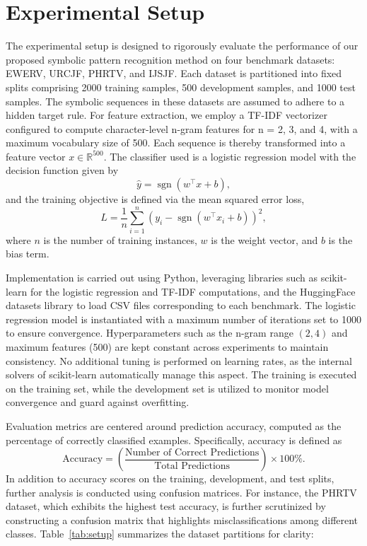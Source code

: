 \documentclass{article}
\begin{document}
\section{Experimental Setup}
The experimental setup is designed to rigorously evaluate the performance of our proposed symbolic pattern recognition method on four benchmark datasets: EWERV, URCJF, PHRTV, and IJSJF. Each dataset is partitioned into fixed splits comprising 2000 training samples, 500 development samples, and 1000 test samples. The symbolic sequences in these datasets are assumed to adhere to a hidden target rule. For feature extraction, we employ a TF-IDF vectorizer configured to compute character-level n-gram features for n = 2, 3, and 4, with a maximum vocabulary size of 500. Each sequence is thereby transformed into a feature vector \( x \in \mathbb{R}^{500} \). The classifier used is a logistic regression model with the decision function given by
\[
\hat{y} = \operatorname{sgn}(w^\top x + b),
\]
and the training objective is defined via the mean squared error loss,
\[
L = \frac{1}{n}\sum_{i=1}^{n}\left(y_i - \operatorname{sgn}(w^\top x_i + b)\right)^2,
\]
where \( n \) is the number of training instances, \( w \) is the weight vector, and \( b \) is the bias term.

Implementation is carried out using Python, leveraging libraries such as scikit-learn for the logistic regression and TF-IDF computations, and the HuggingFace datasets library to load CSV files corresponding to each benchmark. The logistic regression model is instantiated with a maximum number of iterations set to 1000 to ensure convergence. Hyperparameters such as the n-gram range \((2, 4)\) and maximum features (500) are kept constant across experiments to maintain consistency. No additional tuning is performed on learning rates, as the internal solvers of scikit-learn automatically manage this aspect. The training is executed on the training set, while the development set is utilized to monitor model convergence and guard against overfitting.

Evaluation metrics are centered around prediction accuracy, computed as the percentage of correctly classified examples. Specifically, accuracy is defined as
\[
\text{Accuracy} = \left(\frac{\text{Number of Correct Predictions}}{\text{Total Predictions}}\right) \times 100\%.
\]
In addition to accuracy scores on the training, development, and test splits, further analysis is conducted using confusion matrices. For instance, the PHRTV dataset, which exhibits the highest test accuracy, is further scrutinized by constructing a confusion matrix that highlights misclassifications among different classes. Table~\ref{tab:setup} summarizes the dataset partitions for clarity:
\end{document}
